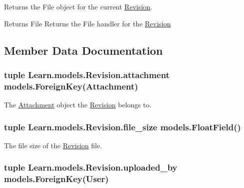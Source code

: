 Returns the File object for the current \hyperlink{class_learn_1_1models_1_1_revision}{Revision}. 

\begin{DoxyReturn}{Returns}
File Returns the File handler for the \hyperlink{class_learn_1_1models_1_1_revision}{Revision} 
\end{DoxyReturn}


\subsection{Member Data Documentation}
\hypertarget{class_learn_1_1models_1_1_revision_a1e0c1e0fafeb906c3ed10e882571f9e2}{
\subsubsection[{attachment}]{\setlength{\rightskip}{0pt plus 5cm}tuple Learn.\-models.\-Revision.\-attachment models.\-Foreign\-Key({\bf Attachment})\hspace{0.3cm}{\ttfamily [static]}}}\label{class_learn_1_1models_1_1_revision_a1e0c1e0fafeb906c3ed10e882571f9e2}


The \hyperlink{class_learn_1_1models_1_1_attachment}{Attachment} object the \hyperlink{class_learn_1_1models_1_1_revision}{Revision} belongs to. 

\hypertarget{class_learn_1_1models_1_1_revision_ace081e49efb42548cc69b3f4dd13d0fb}{
\subsubsection[{file\-\_\-size}]{\setlength{\rightskip}{0pt plus 5cm}tuple Learn.\-models.\-Revision.\-file\-\_\-size models.\-Float\-Field()\hspace{0.3cm}{\ttfamily [static]}}}\label{class_learn_1_1models_1_1_revision_ace081e49efb42548cc69b3f4dd13d0fb}


The file size of the \hyperlink{class_learn_1_1models_1_1_revision}{Revision} file. 

\hypertarget{class_learn_1_1models_1_1_revision_aba129f90cca558a21d55c49935ee0c1a}{
\subsubsection[{uploaded\-\_\-by}]{\setlength{\rightskip}{0pt plus 5cm}tuple Learn.\-models.\-Revision.\-uploaded\-\_\-by models.\-Foreign\-Key({\bf User})\hspace{0.3cm}{\ttfamily [static]}}}\label{class_learn_1_1models_1_1_revision_aba129f90cca558a21d55c49935ee0c1a}



